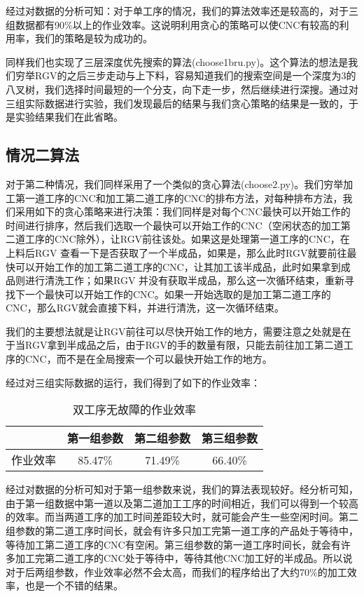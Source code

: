 \documentclass{cumcmthesis}
\begin{document}
经过对数据的分析可知：对于单工序的情况，我们的算法效率还是较高的，对于三组数据都有90\%以上的作业效率。这说明利用贪心的策略可以使CNC有较高的利用率，我们的策略是较为成功的。

同样我们也实现了三层深度优先搜索的算法(choose1bru.py)。这个算法的想法是我们穷举RGV的之后三步走动与上下料，容易知道我们的搜索空间是一个深度为3的八叉树，我们选择时间最短的一个分支，向下走一步，然后继续进行深搜。通过对三组实际数据进行实验，我们发现最后的结果与我们贪心策略的结果是一致的，于是实验结果我们在此省略。


\subsection{情况二算法}

对于第二种情况，我们同样采用了一个类似的贪心算法(choose2.py)。我们穷举加工第一道工序的CNC和加工第二道工序的CNC的排布方法，对每种排布方法，我们采用如下的贪心策略来进行决策：我们同样是对每个CNC最快可以开始工作的时间进行排序，然后我们选取一个最快可以开始工作的CNC（空闲状态的加工第二道工序的CNC除外），让RGV前往该处。如果这是处理第一道工序的CNC，在上料后RGV 查看一下是否获取了一个半成品，如果是，那么此时RGV就要前往最快可以开始工作的加工第二道工序的CNC，让其加工该半成品，此时如果拿到成品则进行清洗工作；如果RGV 并没有获取半成品，那么这一次循环结束，重新寻找下一个最快可以开始工作的CNC。如果一开始选取的是加工第二道工序的CNC，那么RGV就会直接下料，并进行清洗，这一次循环结束。

我们的主要想法就是让RGV前往可以尽快开始工作的地方，需要注意之处就是在于当RGV拿到半成品之后，由于RGV的手的数量有限，只能去前往加工第二道工序的CNC，而不是在全局搜索一个可以最快开始工作的地方。

经过对三组实际数据的运行，我们得到了如下的作业效率：

\begin{table}[!htbp]
\caption{双工序无故障的作业效率} \centering
\begin{tabular}{cccc}
\hline
&第一组参数&第二组参数&第三组参数\\
\hline
作业效率&85.47\%&71.49\%&66.40\%\\
\hline
\end{tabular}
\end{table}

经过对数据的分析可知对于第一组参数来说，我们的算法表现较好。经分析可知，由于第一组数据中第一道以及第二道加工工序的时间相近，我们可以得到一个较高的效率。而当两道工序的加工时间差距较大时，就可能会产生一些空闲时间。第二组参数的第二道工序时间长，就会有许多只加工完第一道工序的产品处于等待中，等待加工第二道工序的CNC有空闲。第三组参数的第一道工序时间长，就会有许多加工完第二道工序的CNC处于等待中，等待其他CNC加工好的半成品。所以说对于后两组参数，作业效率必然不会太高，而我们的程序给出了大约70\%的加工效率，也是一个不错的结果。
\end{document}
